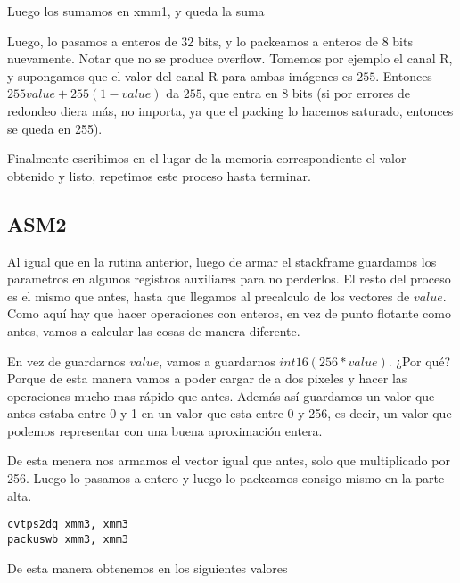 

Luego los sumamos en xmm1, y queda la suma


Luego, lo pasamos a enteros de 32 bits, y lo packeamos a enteros de 8 bits nuevamente. 
Notar que no se produce overflow. Tomemos por ejemplo el canal R, y supongamos que el valor del canal R para ambas imágenes es $255$.
Entonces $255value + 255(1-value)$ da $255$, que entra en 8 bits (si por errores de redondeo diera más, no importa, ya que el packing lo hacemos saturado, entonces se queda en 255).

Finalmente escribimos en el lugar de la memoria correspondiente el valor obtenido y listo, repetimos este proceso hasta terminar.


\subsection{ASM2}

Al igual que en la rutina anterior, luego de armar el stackframe guardamos los parametros en algunos registros auxiliares para no perderlos. El resto del proceso es el mismo que antes, hasta que llegamos al precalculo de los vectores de $value$. Como aquí hay que hacer operaciones con enteros, en vez de punto flotante como antes, vamos a calcular las cosas de manera diferente.

En vez de guardarnos $value$, vamos a guardarnos $int16(256*value)$. ¿Por qué? Porque de esta manera vamos a poder cargar de a dos pixeles y hacer las operaciones mucho mas rápido que antes. Además así guardamos un valor que antes estaba entre 0 y 1 en un valor que esta entre 0 y 256, es decir, un valor que podemos representar con una buena aproximación entera.

De esta menera nos armamos el vector igual que antes, solo que multiplicado por 256. Luego lo pasamos a entero y luego lo packeamos consigo mismo en la parte alta.
\begin{lstlisting}
cvtps2dq xmm3, xmm3
packuswb xmm3, xmm3
\end{lstlisting}


De esta manera obtenemos en  los siguientes valores

